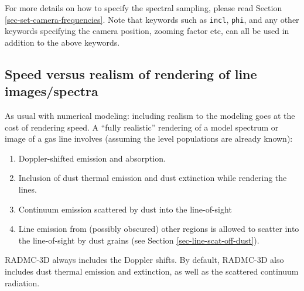 \documentclass{report}
\begin{document}
For more details on how to specify the spectral sampling, please read
Section \ref{sec-set-camera-frequencies}. Note that keywords such as
{\small\tt incl}, {\small\tt phi}, and any other keywords specifying the
camera position, zooming factor etc, can all be used in addition to the
above keywords.


\subsection{Speed versus realism of rendering of line images/spectra}
\label{sec-line-render-speed-realism}
As usual with numerical modeling: including realism to the modeling goes at
the cost of rendering speed. A ``fully realistic'' rendering of a model
spectrum or image of a gas line involves (assuming the level populations
are already known):
\begin{enumerate}
\item Doppler-shifted emission and absorption.
\item Inclusion of dust thermal emission and dust extinction while rendering
  the lines.
\item Continuum emission scattered by dust into the line-of-sight
\item Line emission from (possibly obscured) other regions is allowed to
  scatter into the line-of-sight by dust grains (see Section
  \ref{sec-line-scat-off-dust}).
\end{enumerate}
RADMC-3D always includes the Doppler shifts. By default, RADMC-3D also
includes dust thermal emission and extinction, as well as the scattered
continuum radiation. 


\end{document}
